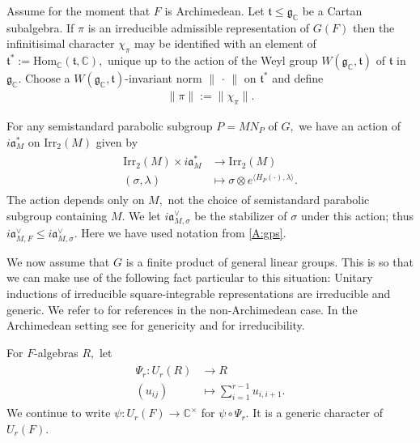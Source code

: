\documentclass[12pt]{amsart}
\theoremstyle{remark}
\numberwithin{equation}{section}
\newcommand{\lto}{\longrightarrow}
\newcommand{\CC}{\mathbb{C}}
\theoremstyle{definition}
\numberwithin{equation}{subsection}
\newcommand{\norm}[1]{\lVert#1\rVert}
\begin{document}
Assume for the moment that $F$ is Archimedean. Let $\mathfrak{t} \leq \mathfrak{g}_{\CC}$ be a Cartan subalgebra.  If $\pi$ is an irreducible admissible representation of $G(F)$ then the infinitisimal character $\chi_{\pi}$ may be identified with an element of  $\mathfrak{t}^*:=\mathrm{Hom}_{\CC}(\mathfrak{t},\CC),$ unique up to the action of the Weyl group $W(\mathfrak{g}_\CC,\mathfrak{t})$ of $\mathfrak{t}$ in $\mathfrak{g}_{\CC}.$  
Choose a $W(\mathfrak{g}_{\CC},\mathfrak{t})$-invariant norm $\norm{\,\cdot\,}$ on $\mathfrak{t}^*$ and define
\begin{align} \label{norm:pi}
    \norm{\pi}:=\norm{\chi_{\pi}}.
\end{align}

For any semistandard parabolic subgroup $P=MN_P$ of $G,$ we have an action of $i\mathfrak{a}_{M}^*$ on $\mathrm{Irr}_2(M)$ given by 
\begin{align*}  \begin{split}
 \mathrm{Irr}_2(M) \times i\mathfrak{a}_{M}^* &\lto\mathrm{Irr}_2(M)\\
(\sigma,\lambda) &\longmapsto  \sigma \otimes e^{\langle H_P(\cdot),\lambda \rangle}. \end{split}
\end{align*}
The action depends only on $M,$ not the choice of semistandard parabolic subgroup containing $M.$
We let $i\mathfrak{a}_{M,\sigma}^\vee$ be the stabilizer of $\sigma$ under this action; thus $
    i\mathfrak{a}_{M,F}^{\vee}  \leq i\mathfrak{a}_{M,\sigma}^\vee.$
    Here we have used notation from \eqref{A:gps}.

We now assume that $G$ is a finite product of general linear groups. This is so that we can make use of the following fact particular to this situation:  Unitary inductions of irreducible square-integrable representations are irreducible and generic.  We refer to \cite[\S 8.4]{Getz:Hahn} for references in the non-Archimedean case.  In the Archimedean setting see  \cite[\S 2]{JacquetPerfectRS} for genericity and \cite[Theorem 1]{Tadic} for irreducibility.

For $F$-algebras $R,$ let
\begin{align*}
\begin{split}
\Psi_r:U_r(R) &\lto R\\
(u_{ij}) &\longmapsto \sum_{i=1}^{r-1}u_{i,i+1}.
\end{split}
\end{align*} 
We continue to write $\psi:U_r(F) \to \CC^\times$ for $\psi \circ \Psi_r.$ It is a generic character of $U_r(F).$
\end{document}
